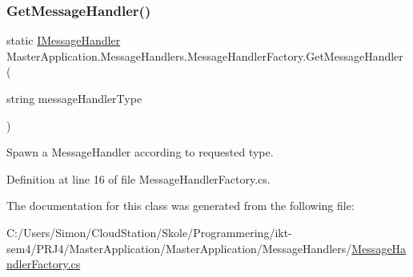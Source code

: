 \subsubsection{\texorpdfstring{Get\+Message\+Handler()}{GetMessageHandler()}}
{\footnotesize\ttfamily static \mbox{\hyperlink{interface_master_application_1_1_message_handlers_1_1_i_message_handler}{I\+Message\+Handler}} Master\+Application.\+Message\+Handlers.\+Message\+Handler\+Factory.\+Get\+Message\+Handler (\begin{DoxyParamCaption}\item[{string}]{message\+Handler\+Type }\end{DoxyParamCaption})\hspace{0.3cm}{\ttfamily [static]}}

Spawn a Message\+Handler according to requested type. 

Definition at line 16 of file Message\+Handler\+Factory.\+cs.



The documentation for this class was generated from the following file\+:\begin{DoxyCompactItemize}
\item 
C\+:/\+Users/\+Simon/\+Cloud\+Station/\+Skole/\+Programmering/ikt-\/sem4/\+P\+R\+J4/\+Master\+Application/\+Master\+Application/\+Message\+Handlers/\mbox{\hyperlink{_message_handler_factory_8cs}{Message\+Handler\+Factory.\+cs}}\end{DoxyCompactItemize}
